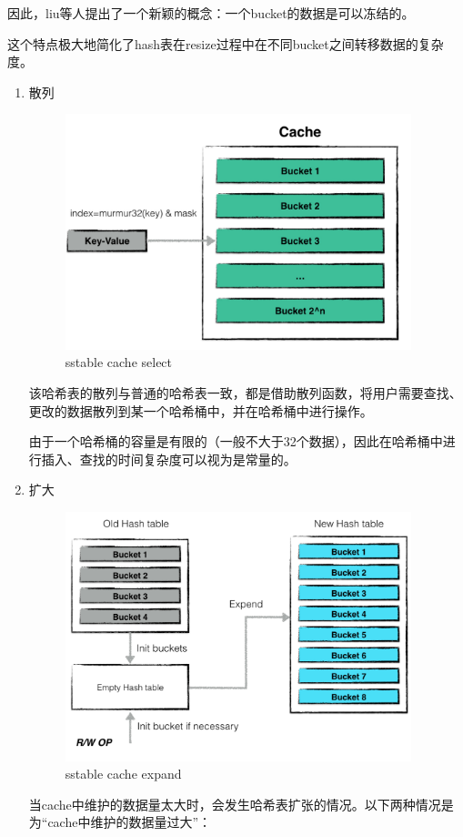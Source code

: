 \begin{enumerate}
因此，liu等人提出了一个新颖的概念：一个bucket的数据是可以冻结的。

这个特点极大地简化了hash表在resize过程中在不同bucket之间转移数据的复杂度。

			\begin{enumerate}
				\item 散列 
				
				\begin{figure}[H]
					\centering
					\includegraphics[width=0.95\textwidth]{images/cache_select.jpeg}
					\caption{sstable cache select}
					\label{sstable_cache_select}
				\end{figure}
				该哈希表的散列与普通的哈希表一致，都是借助散列函数，将用户需要查找、更改的数据散列到某一个哈希桶中，并在哈希桶中进行操作。

由于一个哈希桶的容量是有限的（一般不大于32个数据），因此在哈希桶中进行插入、查找的时间复杂度可以视为是常量的。

				
				\item 扩大
				
				\begin{figure}[H]
					\centering
					\includegraphics[width=0.95\textwidth]{images/cache_expend.jpeg}
					\caption{sstable cache expand}
					\label{sstable_cache_expand}
				\end{figure}
				当cache中维护的数据量太大时，会发生哈希表扩张的情况。以下两种情况是为“cache中维护的数据量过大”：


\end{enumerate}
\end{enumerate}
